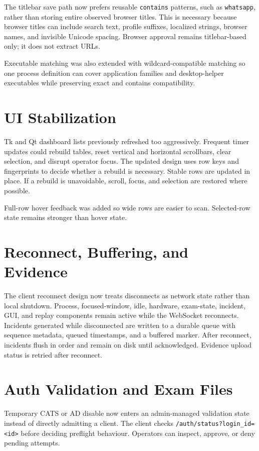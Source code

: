 \documentclass[conference]{IEEEtran}
\begin{document}
The titlebar save path now prefers reusable \texttt{contains} patterns, such as \texttt{whatsapp}, rather than storing entire observed browser titles. This is necessary because browser titles can include search text, profile suffixes, localized strings, browser names, and invisible Unicode spacing. Browser approval remains titlebar-based only; it does not extract URLs.

Executable matching was also extended with wildcard-compatible matching so one process definition can cover application families and desktop-helper executables while preserving exact and contains compatibility.

\section{UI Stabilization}

Tk and Qt dashboard lists previously refreshed too aggressively. Frequent timer updates could rebuild tables, reset vertical and horizontal scrollbars, clear selection, and disrupt operator focus. The updated design uses row keys and fingerprints to decide whether a rebuild is necessary. Stable rows are updated in place. If a rebuild is unavoidable, scroll, focus, and selection are restored where possible.

Full-row hover feedback was added so wide rows are easier to scan. Selected-row state remains stronger than hover state.

\section{Reconnect, Buffering, and Evidence}

The client reconnect design now treats disconnects as network state rather than local shutdown. Process, focused-window, idle, hardware, exam-state, incident, GUI, and replay components remain active while the WebSocket reconnects. Incidents generated while disconnected are written to a durable queue with sequence metadata, queued timestamps, and a buffered marker. After reconnect, incidents flush in order and remain on disk until acknowledged. Evidence upload status is retried after reconnect.

\section{Auth Validation and Exam Files}

Temporary CATS or AD disable now enters an admin-managed validation state instead of directly admitting a client. The client checks \texttt{/auth/status?login\_id=<id>} before deciding preflight behaviour. Operators can inspect, approve, or deny pending attempts.
\end{document}
